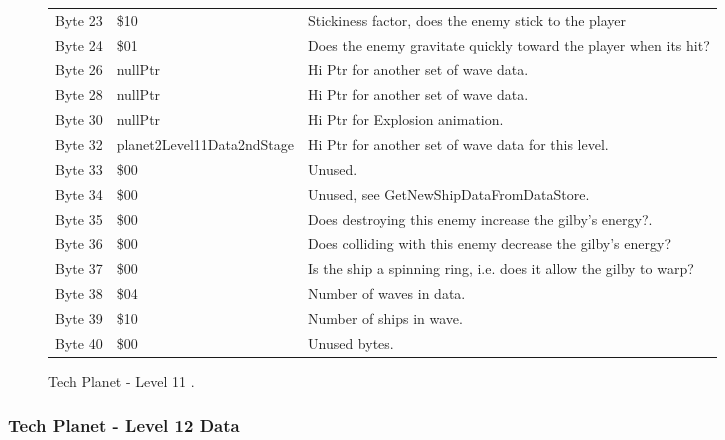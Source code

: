 \begin{figure}[H]
{\begin{adjustbox}{width=12cm}
\begin{tabular}{lll}
 Byte 23 & \$10                        & Stickiness factor, does the enemy stick to the player              \\
 Byte 24 & \$01                        & Does the enemy gravitate quickly toward the player when its hit?   \\
 Byte 26 & nullPtr                    & Hi Ptr for another set of wave data.                               \\
 Byte 28 & nullPtr                    & Hi Ptr for another set of wave data.                               \\
 Byte 30 & nullPtr                    & Hi Ptr for Explosion animation.                                    \\
 Byte 32 & planet2Level11Data2ndStage & Hi Ptr for another set of wave data for this level.                \\
 Byte 33 & \$00                        & Unused.                                                            \\
 Byte 34 & \$00                        & Unused, see GetNewShipDataFromDataStore.                           \\
 Byte 35 & \$00                        & Does destroying this enemy increase the gilby's energy?.           \\
 Byte 36 & \$00                        & Does colliding with this enemy decrease the gilby's energy?        \\
 Byte 37 & \$00                        & Is the ship a spinning ring, i.e. does it allow the gilby to warp? \\
 Byte 38 & \$04                        & Number of waves in data.                                           \\
 Byte 39 & \$10                        & Number of ships in wave.                                           \\
 Byte 40 & \$00                        & Unused bytes.                                                      \\
\bottomrule
\end{tabular}

  \end{adjustbox}

  }\caption*{Tech Planet - Level 11
.}
\end{figure}

\clearpage
\subsubsection{Tech Planet - Level 12 Data}

